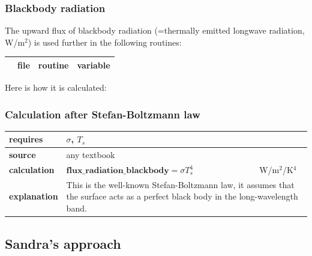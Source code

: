 \documentclass[a4paper,titlepage]{scrartcl}
\begin{document}
\subsubsection{Blackbody radiation}
The upward flux of blackbody radiation (=thermally emitted longwave radiation, W/m$^2$) is used further in the following routines:

\begin{tabular}{llll}
  \hline \hline
  & file & routine & variable \\ 
  \hline
  \hline \hline
\end{tabular}

Here is how it is calculated:

\subsubsection*{Calculation after Stefan-Boltzmann law}
\begin{tabular}{|lll|}
  \hline
  \textbf{requires} & \multicolumn{2}{p{12cm}|}{$\sigma$, $T_s$ } \\
  \hline
  \textbf{source}   & any textbook & \\
  \hline
  \textbf{calculation} & $\mathbf{flux\_radiation\_blackbody} = \sigma T_s^4$  & W/m$^2$/K$^4$ \\
  \hline
	\textbf{explanation} & \multicolumn{2}{p{12cm}|}{This is the well-known Stefan-Boltzmann law, it assumes that the surface acts as a perfect black body in the long-wavelength band.} \\
	\hline
\end{tabular}

\newpage
{}
\subsection{Sandra's approach}
\end{document}
